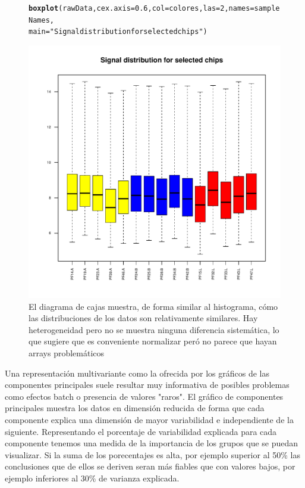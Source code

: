 \documentclass[a4paper]{article}\usepackage[]{graphicx}\usepackage[]{color}
\makeatletter
\def\maxwidth{ %
  \ifdim\Gin@nat@width>\linewidth
    \linewidth
  \else
    \Gin@nat@width
  \fi
}
\newcommand{\hlnum}[1]{\textcolor[rgb]{0.686,0.059,0.569}{#1}}%
\newcommand{\hlstr}[1]{\textcolor[rgb]{0.192,0.494,0.8}{#1}}%
\newcommand{\hlstd}[1]{\textcolor[rgb]{0.345,0.345,0.345}{#1}}%
\newcommand{\hlkwc}[1]{\textcolor[rgb]{0.333,0.667,0.333}{#1}}%
\newcommand{\hlkwd}[1]{\textcolor[rgb]{0.737,0.353,0.396}{\textbf{#1}}}%
\newenvironment{kframe}{%
 \def\at@end@of@kframe{}%
 \ifinner\ifhmode%
  \def\at@end@of@kframe{\end{minipage}}%
  \begin{minipage}{\columnwidth}%
 \fi\fi%
 \def\FrameCommand##1{\hskip\@totalleftmargin \hskip-\fboxsep
 \colorbox{shadecolor}{##1}\hskip-\fboxsep
     \hskip-\linewidth \hskip-\@totalleftmargin \hskip\columnwidth}%
 \MakeFramed {\advance\hsize-\width
   \@totalleftmargin\z@ \linewidth\hsize
   \@setminipage}}%
 {\par\unskip\endMakeFramed%
 \at@end@of@kframe}
\newenvironment{knitrout}{}{} %
\makeatother
\begin{document}
\begin{figure}[htbp]
\centering
\begin{knitrout}
\color{fgcolor}\begin{kframe}
\begin{alltt}
\hlkwd{boxplot}\hlstd{(rawData,} \hlkwc{cex.axis}\hlstd{=}\hlnum{0.6}\hlstd{,} \hlkwc{col}\hlstd{=colores,} \hlkwc{las}\hlstd{=}\hlnum{2}\hlstd{,} \hlkwc{names}\hlstd{=sampleNames,}
        \hlkwc{main}\hlstd{=}\hlstr{"Signal distribution for selected chips"}\hlstd{)}
\end{alltt}
\end{kframe}
\includegraphics[width=\maxwidth]{images/graficboxplot-1} 

\end{knitrout}
  \caption{El diagrama de cajas muestra, de forma similar al histograma, cómo las distribuciones de los datos son relativamente similares. Hay heterogeneidad pero no se muestra ninguna diferencia sistemática, lo que sugiere que es conveniente normalizar peró no parece que hayan arrays problemáticos}
  \label{fig:boxplot}
\end{figure}

Una representación multivariante como la ofrecida por los gráficos de las componentes principales suele resultar muy informativa de posibles problemas como efectos batch o presencia de valores "raros". El gráfico de componentes principales muestra los datos en dimensión reducida de forma que cada componente explica una dimensión de mayor variabilidad e independiente de la siguiente. Representando el porcentaje de variabilidad explicada para cada componente tenemos una medida de la importancia de los grupos que se puedan visualizar. Si la suma de los porecentajes es alta, por ejemplo superior al 50\% las conclusiones que de ellos se deriven seran más fiables que con valores bajos, por ejemplo inferiores al 30\% de varianza explicada.
\end{document}
